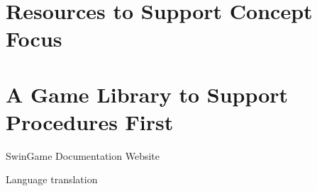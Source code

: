 



\section{Resources to Support Concept Focus} %
\label{sec:arcana}


\section{A Game Library to Support Procedures First} %
\label{sec:swingame}

SwinGame Documentation Website

Language translation







